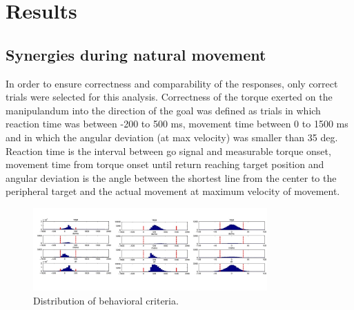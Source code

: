 \chapter{Results} %
\label{sg:cha:results}

\section{Synergies during natural movement} %
\label{sg:sec:nat_mov_syns}


In order to ensure correctness and comparability of the responses, only correct trials were selected for this analysis. Correctness of the torque exerted on the manipulandum into the direction of the goal was defined as trials in which reaction time was between -200 to 500 ms, movement time between 0 to 1500 ms and in which the angular deviation (at max velocity) was smaller than 35 deg. Reaction time is the interval between go signal and measurable torque onset, movement time from torque onset until return reaching target position and angular deviation is the angle between the shortest line from the center to the peripheral target and the actual movement at maximum velocity of movement.
\begin{figure}[ht]
    \centering
        \includegraphics[width=0.8\textwidth]{images/behav_crit.jpg}
    \caption{Distribution of behavioral criteria.}
    \label{sg:fig:images_behav_crit}
\end{figure}


